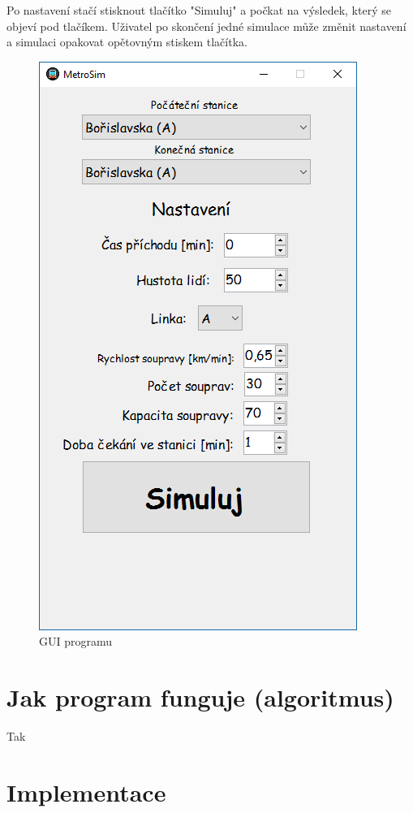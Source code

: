\documentclass[12pt, a4paper]{article}
\begin{document}
Po nastavení stačí stisknout tlačítko "Simuluj" a počkat na výsledek, který se objeví pod tlačíkem. Uživatel po skončení jedné simulace může změnit nastavení a simulaci opakovat opětovným stiskem tlačítka.
\begin{figure}[h]
\centering
\includegraphics[scale=0.5]{obr1}
\caption{GUI programu}
\end{figure}
\section{Jak program funguje (algoritmus)}
Tak
\section{Implementace}
\end{document}
